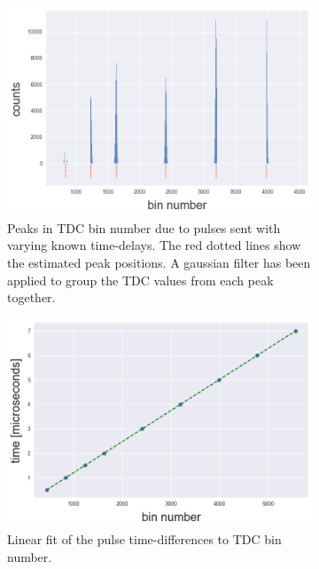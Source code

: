 \documentclass[11pt,a4paper]{article}
\begin{document}
\begin{figure}
\centering
\begin{subfigure}[t]{0.45\textwidth}
\centering
\includegraphics[width=\textwidth]{time_calibration_counts_over_bin.png}
\caption{Peaks in TDC bin number due to pulses sent with varying known time-delays.
The red dotted lines show the estimated peak positions. A gaussian filter has been applied to group the TDC values from each peak together.}
\label{fig:time_calibration_data}
\end{subfigure}
\hfill
\begin{subfigure}[t]{0.45\textwidth}
    \centering
    \includegraphics[width=\textwidth]{time_calibration_fit.png}
    \caption{Linear fit of the pulse time-differences to TDC bin number.}
    \label{fig:time_calibration_fit}
\end{subfigure}
\caption{}
\label{fig:time_calibration}
\end{figure}
\end{document}
